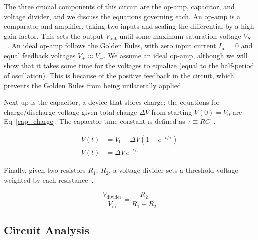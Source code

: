 \documentclass[11pt]{article}
\begin{document}
The three crucial components of this circuit are the op-amp, capacitor, and voltage divider, and we discuss the equations governing each. An op-amp is a comparator and amplifier, taking two inputs and scaling the differential by a high gain factor. This sets the output $V_\text{out}$ until some maximum saturation voltage $V_S$~\cite{graham}. An ideal op-amp follows the Golden Rules, with zero input current $I_\text{in}=0$ and equal feedback voltages $V_{+}\approx  V_{-}$. We assume an ideal op-amp, although we will show that it takes some time for the voltages to equalize (equal to the half-period of oscillation). This is because of the positive feedback in the circuit, which prevents the Golden Rules from being unilaterally applied.

Next up is the capacitor, a device that stores charge; the equations for charge/discharge voltage given total change $\Delta V$ from starting $V(0)=V_0$ are Eq~\eqref{cap_charge}. The capacitor time constant is defined as $\tau\equiv RC$~\cite{graham}.

\begin{align}
        \label{cap_charge}
        V(t) & =V_0+\Delta V\left(1-e^{-t/\tau}\right) \\
        V(t) & =\Delta V\,e^{-t/\tau}
\end{align}

Finally, given two resistors $R_1, \ R_2$, a voltage divider sets a threshold voltage weighted by each resistance~\cite{graham}.


\begin{equation}
        \label{eq:vdivider}
        \frac{V_{\text{divider}}}{V_\mathrm{in} } =   \frac{R_2}{R_1 + R_2}
\end{equation}


\subsection{Circuit Analysis}
\end{document}
